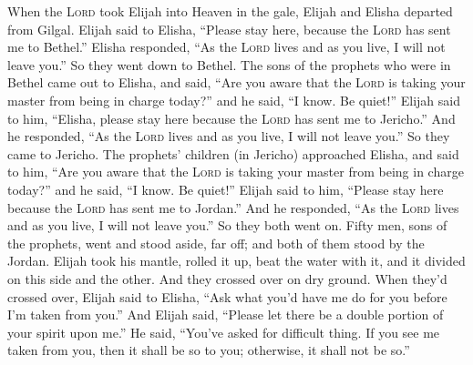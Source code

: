 
\begin{inparaenum}
     When the \textsc{Lord} took Elijah into Heaven in the gale, Elijah and Elisha departed from Gilgal.%
     Elijah said to Elisha, ``Please stay here, because the \textsc{Lord} has sent me to Bethel.'' Elisha responded, ``As the \textsc{Lord} lives and as you live, I will not leave you.'' So they went down to Bethel.%
     The sons of the prophets who were in Bethel came out to Elisha, and said, ``Are you aware that the \textsc{Lord} is taking your master from being in charge today?'' and he said, ``I know. Be quiet!''%
     Elijah said to him, ``Elisha, please stay here because the \textsc{Lord} has sent me to Jericho.'' And he responded, ``As the \textsc{Lord} lives and as you live, I will not leave you.'' So they came to Jericho.%
     The prophets' children (in Jericho) approached Elisha, and said to him, ``Are you aware that the \textsc{Lord} is taking your master from being in charge today?'' and he said, ``I know. Be quiet!''%
     Elijah said to him, ``Please stay here because the \textsc{Lord} has sent me to Jordan.'' And he responded, ``As the \textsc{Lord} lives and as you live, I will not leave you.'' So they both went on.%
     Fifty men, sons of the prophets, went and stood aside, far off; and both of them stood by the Jordan.%
     Elijah took his mantle, rolled it up, beat the water with it, and it divided on this side and the other. And they crossed over on dry ground.%
     When they'd crossed over, Elijah said to Elisha, ``Ask what you'd have me do for you before I'm taken from you.'' And Elijah said, ``Please let there be a double portion of your spirit upon me.''%
     He said, ``You've asked for difficult thing. If you see me taken from you, then it shall be so to you; otherwise, it shall not be so.''%

\end{inparaenum}
